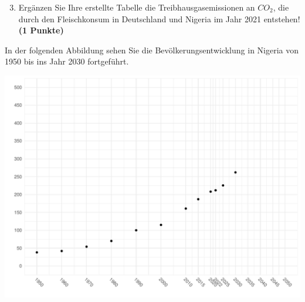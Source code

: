 \documentclass[a4paper, 10pt]{scrartcl}\usepackage[]{graphicx}\usepackage[]{xcolor}
\makeatletter
\def\maxwidth{ %
  \ifdim\Gin@nat@width>\linewidth
    \linewidth
  \else
    \Gin@nat@width
  \fi
}
\newenvironment{knitrout}{}{} %
\makeatother
\begin{document}
\begin{enumerate}
  \setcounter{enumi}{2}  
\item Erg{\"a}nzen Sie Ihre erstellte Tabelle die Treibhausgasemissionen an $CO_2$, die durch den
  Fleischkonsum in Deutschland und Nigeria im Jahr 2021 entstehen!
  \textbf{(1 Punkte)}
\end{enumerate}

\newpage

In der folgenden Abbildung sehen Sie die
Bev{\"o}lkerungsentwicklung in Nigeria von 1950 bis ins Jahr 2030 fortgef{\"u}hrt.

\begin{knitrout}
\color{fgcolor}

{\centering \includegraphics[width=\maxwidth]{img/math-14-c-1} 

}


\end{knitrout}
\end{document}
